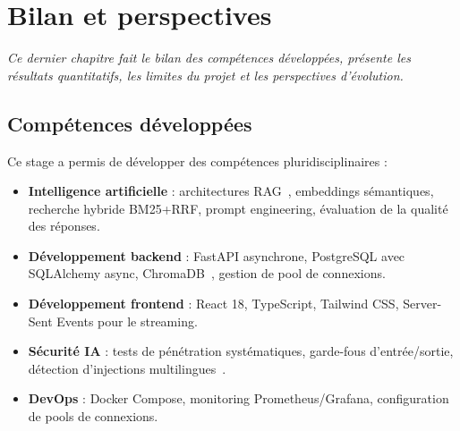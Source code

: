\documentclass[12pt,a4paper,oneside]{report}
\newcommand{\chaptercolor}{mainblue}
\newcommand{\setchaptercolor}[1]{\renewcommand{\chaptercolor}{#1}}
\newcommand{\chapterabstract}[1]{\vspace{-0.5cm}\begin{center}\begin{minipage}{0.9\textwidth}\small\itshape\textcolor{\chaptercolor!70!black}{#1}\end{minipage}\end{center}\vspace{0.5cm}}
\begin{document}


\setchaptercolor{mainblue}

\chapter{Bilan et perspectives}

\chapterabstract{Ce dernier chapitre fait le bilan des comp\'{e}tences d\'{e}velopp\'{e}es, pr\'{e}sente les r\'{e}sultats quantitatifs, les limites du projet et les perspectives d'\'{e}volution.}



\section{Comp\'{e}tences d\'{e}velopp\'{e}es}



Ce stage a permis de d\'{e}velopper des comp\'{e}tences pluridisciplinaires :



\begin{itemize}[leftmargin=1.2cm]

\item \textbf{Intelligence artificielle} : architectures RAG~\cite{lewis2020rag}, embeddings s\'{e}mantiques, recherche hybride BM25+RRF, prompt engineering, \'{e}valuation de la qualit\'{e} des r\'{e}ponses.

\item \textbf{D\'{e}veloppement backend} : FastAPI asynchrone, PostgreSQL avec SQLAlchemy async, ChromaDB~\cite{chromadb}, gestion de pool de connexions.

\item \textbf{D\'{e}veloppement frontend} : React 18, TypeScript, Tailwind CSS, Server-Sent Events pour le streaming.

\item \textbf{S\'{e}curit\'{e} IA} : tests de p\'{e}n\'{e}tration syst\'{e}matiques, garde-fous d'entr\'{e}e/sortie, d\'{e}tection d'injections multilingues~\cite{owasp_llm}.

\item \textbf{DevOps} : Docker Compose, monitoring Prometheus/Grafana, configuration de pools de connexions.

\end{itemize}
\end{document}
